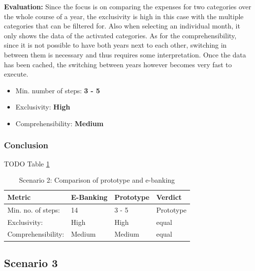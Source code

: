 \textbf{Evaluation:} Since the focus is on comparing the expenses for two categories over the whole course of a year, the exclusivity is high in this case with the multiple categories that can be filtered for. Also when selecting an individual month, it only shows the data of the activated categories. As for the comprehensibility, since it is not possible to have both years next to each other, switching in between them is necessary and thus requires some interpretation. Once the data has been cached, the switching between years however becomes very fast to execute.
\begin{itemize}[noitemsep,nolistsep]
	\item Min. number of steps: \textbf{3 - 5}
	\item Exclusivity: \textbf{High}
	\item Comprehensibility: \textbf{Medium}
\end{itemize}



\subsubsection{Conclusion}

TODO Table \ref{tbl:scenariotwocomparison}

\begin{table}[h]
	\begin{center}
		\begin{tabular}{ | p{3.2cm} | p{3.8cm} | p{3.5cm} | p{2.5cm} | }
			\hline
			\textbf{Metric} & \textbf{E-Banking} & \textbf{Prototype} & \textbf{Verdict} \\
			\hline
			Min. no. of steps: & 14 & 3 - 5 & Prototype \\
			\hline
			Exclusivity: & High & High & equal \\
			\hline
			Comprehensibility: & Medium & Medium & equal \\
			\hline
		\end{tabular}
		\caption{Scenario 2: Comparison of prototype and e-banking}
		\label{tbl:scenariotwocomparison}
	\end{center}
\end{table}



\subsection{Scenario 3}

